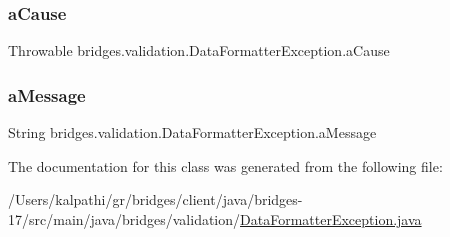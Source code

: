 \subsubsection{\texorpdfstring{a\+Cause}{aCause}}
{\footnotesize\ttfamily Throwable bridges.\+validation.\+Data\+Formatter\+Exception.\+a\+Cause}

\mbox{\label{classbridges_1_1validation_1_1_data_formatter_exception_a8cab4688a8a80a0575bcda28e6ac7b8c}} 
\subsubsection{\texorpdfstring{a\+Message}{aMessage}}
{\footnotesize\ttfamily String bridges.\+validation.\+Data\+Formatter\+Exception.\+a\+Message}



The documentation for this class was generated from the following file\+:\begin{DoxyCompactItemize}
\item 
/\+Users/kalpathi/gr/bridges/client/java/bridges-\/17/src/main/java/bridges/validation/\mbox{\hyperlink{_data_formatter_exception_8java}{Data\+Formatter\+Exception.\+java}}\end{DoxyCompactItemize}
